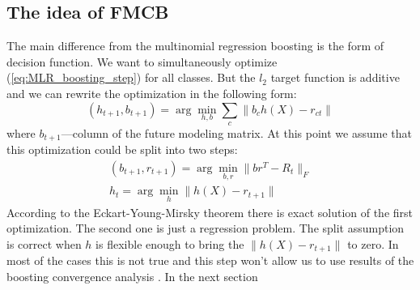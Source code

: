 \documentclass{article}
\begin{document}
\subsection{The idea of FMCB}
The main difference from the multinomial regression boosting is the form of decision function. We want to simultaneously optimize (\ref{eq:MLR_boosting_step}) for all classes. But the $l_2$ target function is additive and we can rewrite the optimization in the following form:
\begin{equation}
(h_{t+1},b_{t+1}) = \arg \min_{h,b} \sum_c \|b_ch(X) - r_{ct}\|
\end{equation}
where $b_{t+1}$---column of the future modeling matrix. At this point we assume that this optimization could be split into two steps:
\begin{equation}\begin{array}{l}
(b_{t+1},r_{t+1}) = \arg \min_{b,r} \|b r^T - R_t\|_F \\
h_t	= \arg \min_{h} \|h(X) - r_{t+1}\|
\end{array}\end{equation}
According to the Eckart-Young-Mirsky theorem \cite{Eckart1936} there is exact solution of the first optimization. The second one is just a regression problem. The split assumption is correct when $h$ is flexible enough to bring the $\|h(X) - r_{t+1}\|$ to zero. In most of the cases this is not true and this step won't allow us to use results of the boosting convergence analysis \cite{??}. In the next section
\end{document}
